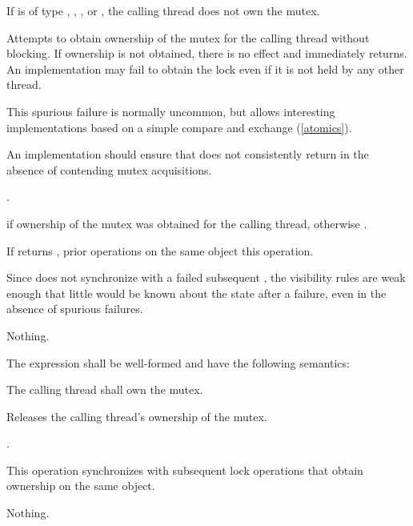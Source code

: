 \begin{itemdescr}
\pnum
\requires If  is of type , ,
, or , the calling
thread does not own the mutex.

\pnum
\effects Attempts to obtain ownership of the mutex for the calling thread without
blocking. If ownership is not obtained, there is no effect and 
immediately returns. An implementation may fail to obtain the lock even if it is not
held by any other thread. \begin{note} This spurious failure is normally uncommon, but
allows interesting implementations based on a simple
compare and exchange
(\ref{atomics}). \end{note}
An implementation should ensure that  does not consistently return 
in the absence of contending mutex acquisitions.

\pnum
\returntype {}.

\pnum
\returns {} if ownership of the mutex was obtained for the calling
thread, otherwise .

\pnum
\sync If  returns , prior  operations
on the same object  this operation.
\begin{note} Since  does not synchronize with a failed subsequent
, the visibility rules are weak enough that little would be
known about the state after a failure, even in the absence of spurious failures. \end{note}

\pnum
\throws Nothing.
\end{itemdescr}

\pnum
The expression  shall be well-formed and have the following semantics:

\begin{itemdescr}
\pnum
\requires The calling thread shall own the mutex.

\pnum
\effects Releases the calling thread's ownership of the mutex.

\pnum
\returntype {}.

\pnum
\sync This operation synchronizes with subsequent
lock operations that obtain ownership on the same object.

\pnum
\throws Nothing.
\end{itemdescr}

